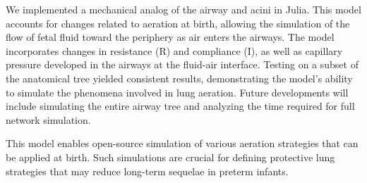 We implemented a mechanical analog of the airway and acini in
Julia. This model accounts for changes related to aeration at birth,
allowing the simulation of the flow of fetal fluid toward the
periphery as air enters the airways. The model incorporates changes in
resistance (R) and compliance (I), as well as capillary pressure
developed in the airways at the fluid-air interface. Testing on a
subset of the anatomical tree yielded consistent results,
demonstrating the model's ability to simulate the phenomena involved
in lung aeration. Future developments will include simulating the
entire airway tree and analyzing the time required for full network
simulation.

This model enables open-source simulation of various aeration
strategies that can be applied at birth. Such simulations are crucial
for defining protective lung strategies that may reduce long-term
sequelae in preterm infants.

